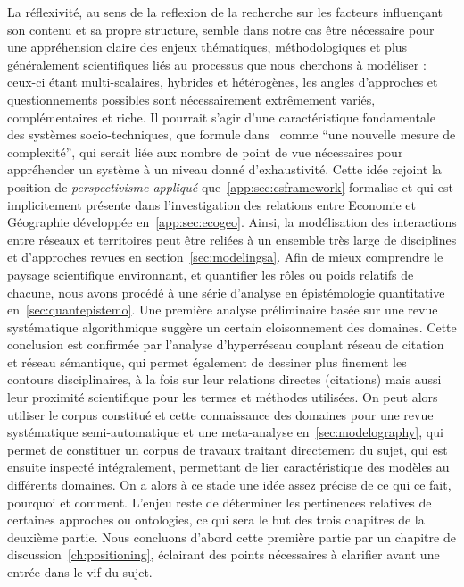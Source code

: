 La réflexivité, au sens de la reflexion de la recherche sur les facteurs influençant son contenu et sa propre structure, semble dans notre cas être nécessaire pour une appréhension claire des enjeux thématiques, méthodologiques et plus généralement scientifiques liés au processus que nous cherchons à modéliser : ceux-ci étant multi-scalaires, hybrides et hétérogènes, les angles d'approches et questionnements possibles sont nécessairement extrêmement variés, complémentaires et riche. Il pourrait s'agir d'une caractéristique fondamentale des systèmes socio-techniques, que  formule dans~\cite{pumain2005cumulativite} comme ``une nouvelle mesure de complexité'', qui serait liée aux nombre de point de vue nécessaires pour appréhender un système à un niveau donné d'exhaustivité. Cette idée rejoint la position de \emph{perspectivisme appliqué} que~\ref{app:sec:csframework} formalise et qui est implicitement présente dans l'investigation des relations entre Economie et Géographie développée en~\ref{app:sec:ecogeo}. Ainsi, la modélisation des interactions entre réseaux et territoires peut être reliées à un ensemble très large de disciplines et d'approches revues en section~\ref{sec:modelingsa}. Afin de mieux comprendre le paysage scientifique environnant, et quantifier les rôles ou poids relatifs de chacune, nous avons procédé à une série d'analyse en épistémologie quantitative en~\ref{sec:quantepistemo}. Une première analyse préliminaire basée sur une revue systématique algorithmique suggère un certain cloisonnement des domaines. Cette conclusion est confirmée par l'analyse d'hyperréseau couplant réseau de citation et réseau sémantique, qui permet également de dessiner plus finement les contours disciplinaires, à la fois sur leur relations directes (citations) mais aussi leur proximité scientifique pour les termes et méthodes utilisées. On peut alors utiliser le corpus constitué et cette connaissance des domaines pour une revue systématique semi-automatique et une meta-analyse en~\ref{sec:modelography}, qui permet de constituer un corpus de travaux traitant directement du sujet, qui est ensuite inspecté intégralement, permettant de lier caractéristique des modèles au différents domaines. On a alors à ce stade une idée assez précise de ce qui ce fait, pourquoi et comment. L'enjeu reste de déterminer les pertinences relatives de certaines approches ou ontologies, ce qui sera le but des trois chapitres de la deuxième partie. Nous concluons d'abord cette première partie par un chapitre de discussion~\ref{ch:positioning}, éclairant des points nécessaires à clarifier avant une entrée dans le vif du sujet.






\stars
